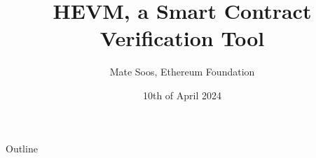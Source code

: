 \documentclass[aspectratio=169]{beamer}
\title{HEVM, a Smart Contract Verification Tool}
\author{Mate Soos, Ethereum Foundation}
\date{10th of April 2024}
\begin{document}
\begin{frame}
    \titlepage 
\end{frame}

%

\begin{frame}{Outline}
    \tableofcontents
\end{frame}


\end{document}
